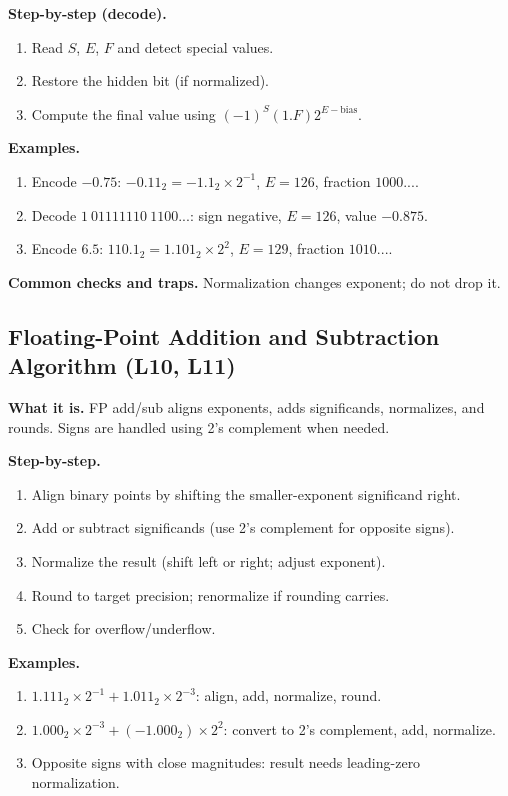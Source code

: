 \documentclass[11pt]{article}
\begin{document}
\textbf{Step-by-step (decode).}
\begin{enumerate}[leftmargin=*]
  \item Read $S$, $E$, $F$ and detect special values.
  \item Restore the hidden bit (if normalized).
  \item Compute the final value using $(-1)^S (1.F) 2^{E-\text{bias}}$.
\end{enumerate}

\textbf{Examples.}
\begin{enumerate}[leftmargin=*]
  \item Encode $-0.75$: $-0.11_2 = -1.1_2 \times 2^{-1}$, $E=126$, fraction $1000...$.
  \item Decode $1\ 01111110\ 1100...$: sign negative, $E=126$, value $-0.875$.
  \item Encode $6.5$: $110.1_2 = 1.101_2 \times 2^2$, $E=129$, fraction $1010...$.
\end{enumerate}

\textbf{Common checks and traps.} Normalization changes exponent; do not drop it.

\subsection{Floating-Point Addition and Subtraction Algorithm (L10, L11)}
\textbf{What it is.} FP add/sub aligns exponents, adds significands, normalizes, and rounds. Signs are handled using 2's complement when needed.

\textbf{Step-by-step.}
\begin{enumerate}[leftmargin=*]
  \item Align binary points by shifting the smaller-exponent significand right.
  \item Add or subtract significands (use 2's complement for opposite signs).
  \item Normalize the result (shift left or right; adjust exponent).
  \item Round to target precision; renormalize if rounding carries.
  \item Check for overflow/underflow.
\end{enumerate}

\textbf{Examples.}
\begin{enumerate}[leftmargin=*]
  \item $1.111_2 \times 2^{-1} + 1.011_2 \times 2^{-3}$: align, add, normalize, round.
  \item $1.000_2 \times 2^{-3} + (-1.000_2) \times 2^{2}$: convert to 2's complement, add, normalize.
  \item Opposite signs with close magnitudes: result needs leading-zero normalization.
\end{enumerate}
\end{document}
